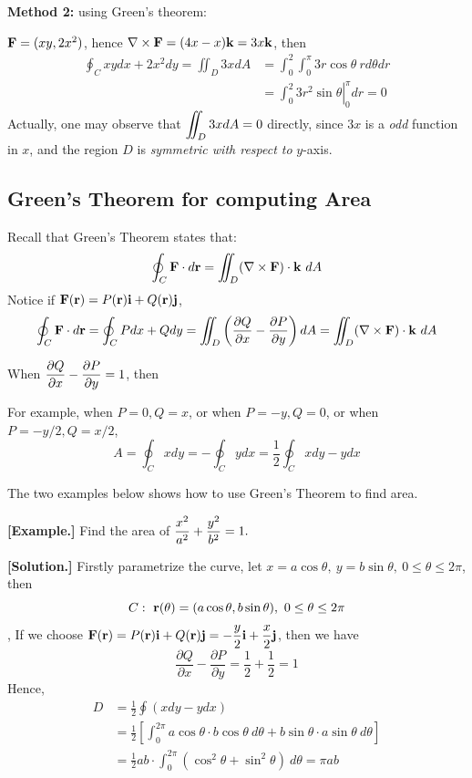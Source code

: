\documentclass[11pt, a4paper]{MATH2023}
\newcommand{\eg}{\textbf{[Example.] }}
\newcommand{\sol}{\textbf{[Solution.] }}
\newcommand{\ii}{{\bf i}}
\newcommand{\jj}{{\bf j}}
\newcommand{\kk}{{\bf k}}
\newcommand{\rr}{{\bf r}}
\newcommand{\FF}{{\bf F}}
\newcommand{\pt}{\partial}
\begin{document}
\begin{spacing}{1.3}
    \vspace{0.5in}
    {\bf Method 2: } using Green's theorem:

    $\FF=(xy, 2x^2)$, hence $\nabla \times \FF=(4x-x)\kk =3x\kk$, then
    \begin{align*}
        \oint_{C} x y d x+2 x^{2} d y = \iint_D 3x dA &=\int_0^2\int_0^{\pi} 3r\cos\theta \ rd\theta dr \\
            &= \left. \int_0^2 3r^2\sin\theta \right|_0^{\pi} dr=0
    \end{align*}
    Actually, one may observe that $\displaystyle \iint_D 3x dA=0$ directly, since $3x$ is a {\it odd} function in 
    $x$, and the region $D$ is {\it symmetric with respect to }$y$-axis.



    \newpage
    \subsection{Green's Theorem for computing Area}

    Recall that Green's Theorem states that:
    $$\oint_C \FF\cdot d\rr=\iint_D (\nabla \times \FF)\cdot \kk\ dA$$
    Notice if $\FF(\rr)=P(\rr)\ii+Q(\rr)\jj$,
    $$\oint_{C} \mathbf{F} \cdot d \mathbf{r}=\oint_{C} P d x+Q d y
    =\iint_{D}\left(\frac{\partial Q}{\partial x}-\frac{\partial P}{\partial y}\right) d A
    =\iint_D (\nabla \times \FF)\cdot \kk\ dA$$

    When $\disp \frac{\pt Q}{\pt x}-\frac{\pt P}{\pt y}=1$, then 
    \begin{center}
    \end{center}

    For example, when $P=0, Q=x$, or when $P=-y, Q=0$, or when $P=-y/2, Q=x/2$,
    $$A=\oint_C xdy=-\oint_C ydx=\frac{1}{2}\oint_C xdy-ydx$$



    \newpage
    {\blue The two examples below shows how to use Green's Theorem to find area.}

    \eg Find the area of $\displaystyle \frac{x^2}{a^2}+\frac{y^2}{b^2}=1.$

    \sol Firstly parametrize the curve, let $x=a\cos\theta,\ y=b\sin\theta,\ 0\le \theta\le 2\pi$, then 
    $$C:\ \rr(\theta)=(a\cos\theta, b\sin\theta),\ 0\le \theta\le 2\pi$$,
    If we choose $\disp \FF(\rr)=P(\rr)\ii+Q(\rr)\jj=-\frac{y}{2}\ii+\frac{x}{2}\jj$, then we have
    $$\frac{\pt Q}{\pt x}-\frac{\pt P}{\pt y}=\frac{1}{2}+\frac{1}{2}=1$$
    Hence, 
    \begin{align*}
        D &= \frac{1}{2} \oint (xdy-ydx)\\
        &= \frac{1}{2} \left[ \int_0^{2\pi} a\cos\theta\cdot b\cos\theta\ d\theta 
        + b\sin\theta\cdot a\sin\theta\ d\theta \right]\\
        &= \frac{1}{2} ab \cdot \int_0^{2\pi} (\cos^2\theta+\sin^2\theta)\ d\theta =\pi ab
    \end{align*}



\end{spacing}
\end{document}
